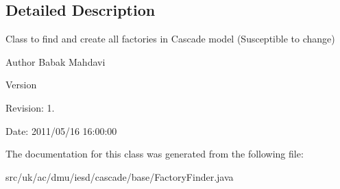 \subsection{Detailed Description}
Class to find and create all factories in Cascade model (Susceptible to change) 

\begin{DoxyAuthor}{Author}
Babak Mahdavi 
\end{DoxyAuthor}
\begin{DoxyVersion}{Version}

\end{DoxyVersion}
\begin{DoxyParagraph}{Revision\-:}
1. 
\end{DoxyParagraph}
\begin{DoxyParagraph}{Date\-:}
2011/05/16 16\-:00\-:00 
\end{DoxyParagraph}


The documentation for this class was generated from the following file\-:\begin{DoxyCompactItemize}
\item 
src/uk/ac/dmu/iesd/cascade/base/Factory\-Finder.\-java\end{DoxyCompactItemize}
